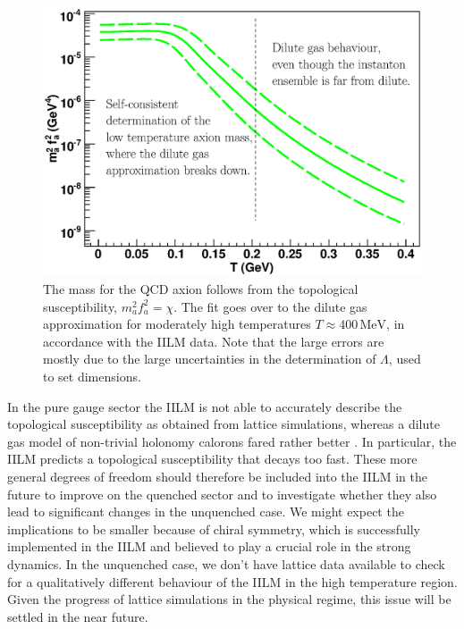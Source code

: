 \documentclass[preprint,nofootinbib]{revtex4}
\newcommand{\units}[1]{\, \mathrm{#1}}
\begin{document}
\begin{figure}[tbp]
\begin{center}
 \includegraphics[width=\figwidth,clip=true,trim=0mm 0mm 15mm 10mm]{mass.eps}
\end{center}
\caption{The mass for the QCD axion follows from the topological susceptibility, $m^2_a f^2_a = \chi$. The fit goes over to the dilute gas approximation for moderately high temperatures $T\approx 400\units{MeV}$, in accordance with the IILM data. Note that the large errors are mostly due to the large uncertainties in the determination of $\Lambda$, used to set dimensions.}\label{fig:mass}
\end{figure}

In the pure gauge sector the IILM is not able to accurately describe the topological susceptibility as obtained from lattice simulations, whereas a dilute gas model of non-trivial holonomy calorons fared rather better \cite{gerhold:ilgenfritz:mueller_preussker:kvbll:gas:confinement}. In particular, the IILM predicts a topological susceptibility that decays too fast. These more general degrees of freedom should therefore be included into the IILM in the future to improve on the quenched sector and to investigate whether they also lead to significant changes in the unquenched case. We might expect the implications to be smaller because of chiral symmetry, which is successfully implemented in the IILM and believed to play a crucial role in the strong dynamics.  In the unquenched case, we don't have lattice data available to check for a qualitatively different behaviour of the IILM in the high temperature region. Given the progress of lattice simulations in the physical regime, this issue will be settled in the near future.
\end{document}
